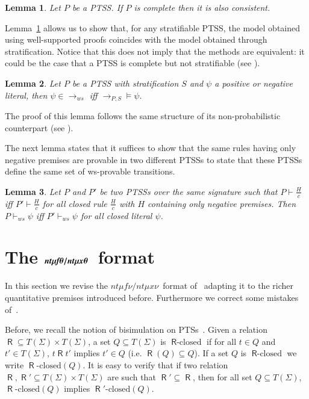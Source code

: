 \documentclass[submission,copyright,creativecommons]{eptcs}
\newtheorem{lemma}{Lemma}
\newcommand{\dedrule}[2]{\frac{#1}{#2}}
\newcommand{\trans}[1][]{\xrightarrow{\, {#1} \, }}
\newcommand{\closedTerms}{T(\Sigma)}
\newcommand{\ntmufnu}{\ensuremath{\textit{nt}\mu\textit{f}\nu}}
\newcommand{\ntmuxnu}{\ensuremath{\textit{nt}\mu\textit{x}\nu}}
\newcommand{\ntmufxnu}{\ensuremath{\ntmufnu\textit{/}\ntmuxnu}}
\newcommand{\bntmuft}{\ensuremath{\textit{\bfseries nt}\boldmath\mu\textit{\bfseries f}\boldmath\theta}}
\newcommand{\bntmuxt}{\ensuremath{\textit{\bfseries nt}\boldmath\mu\textit{\bfseries x}\boldmath\theta}}
\newcommand{\bntmufxt}{\ensuremath{\bntmuft/\bntmuxt}}
\newcommand{\relR}{\mathrel{\textsf{R}}}
\newcommand{\closed}[1]{{#1}\text{-closed}}
\newcommand{\proves}{\vdash}
\begin{document}
\begin{lemma}\label{lemma:completeThenCons}
 Let $P$ be a PTSS. If $P$ is complete then it is also consistent.
\end{lemma}

 Lemma~\ref{lemma:completeThenCons} allows us to show that, for any stratifiable PTSS, the model obtained using well-supported proofs coincides with the model obtained through stratification. 
Notice that this does not imply that the methods are equivalent: it could be the case
 that a PTSS is complete but not stratifiable (see \cite[Prop. 27]{vanGlabbeek04}).


\begin{lemma}\label{lemma:WSPsubsumesStra}
 Let $P$ be a PTSS with stratification $S$ and $\psi$ a positive or negative literal, 
 then  $\psi \in {\trans_{ws}}$ iff ${\trans_{P, S}} \models \psi$.
\end{lemma}

The proof of this lemma follows the same structure of its non-probabilistic counterpart (see \cite[Prop. 25]{vanGlabbeek04}).


The next lemma states that it suffices to show that the same rules
having only negative premises are provable in two different PTSSs to
state that these PTSSs define the same set of ws-provable transitions.


\begin{lemma}\label{lemma:sameNegRules}
 Let $P$ and $P'$ be two PTSSs over the same signature such that
 $P \proves \dedrule{H}{c}$ iff $P' \proves \dedrule{H}{c}$ for all closed rule $\dedrule{H}{c}$ with $H$ containing only negative premises.  Then  
 $P \proves_{ws} \psi$ iff $P' \proves_{ws} \psi$ for all closed literal $\psi$. 
\end{lemma}
  

\section{The \bntmufxt\  format}


In this section we revise the \ntmufxnu\ format of~\cite{DL-fossacs12}
adapting it to the richer quantitative premises introduced before.
Furthermore we correct some mistakes of~\cite{DL-fossacs12}.

Before, we recall the notion of bisimulation on PTSs~\cite{LarsenSkou91}. 
Given a relation ${\relR} \subseteq \closedTerms \times \closedTerms$,
a set $Q \subseteq \closedTerms$ is $\closed{\relR}$ if for all $t \in
Q$ and $t' \in \closedTerms$, $t \relR t'$ implies $t' \in Q$
(i.e. ${\relR}(Q) \subseteq Q$).
If a set $Q$ is $\closed{\relR}$ we write $\closed{\relR}(Q)$.
It is easy to verify that if two relation ${\relR},
{\relR'} \subseteq \closedTerms \times \closedTerms$ are such that
${\relR'}\subseteq{\relR}$, then for all set $Q \subseteq
\closedTerms$, $\closed{\relR}(Q)$ implies $\closed{\relR'}(Q)$.
\end{document}

